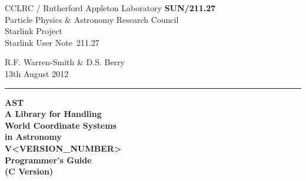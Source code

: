 \documentclass[twoside,11pt]{article}
\newcommand{\stardoccategory}  {Starlink User Note}
\newcommand{\stardocinitials}  {SUN}
\newcommand{\stardocnumber}    {211.27}
\newcommand{\stardocnumber}    {210.27}
\newcommand{\stardocauthors}   {R.F. Warren-Smith \& D.S. Berry}
\newcommand{\stardocdate}      {13th August 2012}
\newcommand{\stardoctitle}     {AST\\
                                A Library for Handling\\
                                World Coordinate Systems\\
                                in Astronomy}
\newcommand{\stardocversion}   {V<VERSION_NUMBER>}
\newcommand{\stardocmanual}    {Programmer's Guide\\(C Version)}
\newcommand{\stardocmanual}    {Programmer's Guide\\(Fortran Version)}
\newcommand{\stardocname}{\stardocinitials /\stardocnumber}
\newenvironment{latexonly}{}{}
\begin{document}
\thispagestyle{empty}

\begin{latexonly}
   CCLRC / {\sc Rutherford Appleton Laboratory} \hfill {\bf \stardocname}\\
   {\large Particle Physics \& Astronomy Research Council}\\
   {\large Starlink Project\\}
   {\large \stardoccategory\ \stardocnumber}
   \begin{flushright}
   \stardocauthors\\
   \stardocdate
   \end{flushright}
   \vspace{-4mm}
   \rule{\textwidth}{0.5mm}
   \vspace{-7mm}
   \begin{center}
   {\Huge\bf  \stardoctitle \\ [2.0ex]}
   {\LARGE\bf \stardocversion \\ [1.0ex]}
   {\Huge\bf  \stardocmanual}
   \end{center}


\end{latexonly}
\end{document}
